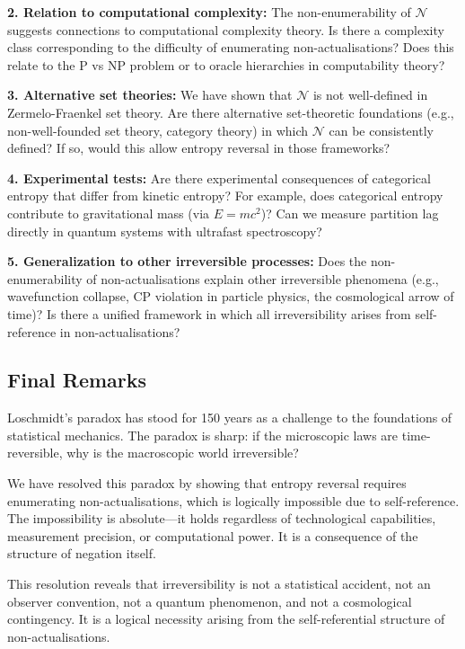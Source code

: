 \documentclass[twocolumn,10pt]{article}
\theoremstyle{definition}
\theoremstyle{remark}
\begin{document}
\textbf{2. Relation to computational complexity:} The non-enumerability of $\mathcal{N}$ suggests connections to computational complexity theory. Is there a complexity class corresponding to the difficulty of enumerating non-actualisations? Does this relate to the P vs NP problem or to oracle hierarchies in computability theory?

\textbf{3. Alternative set theories:} We have shown that $\mathcal{N}$ is not well-defined in Zermelo-Fraenkel set theory. Are there alternative set-theoretic foundations (e.g., non-well-founded set theory, category theory) in which $\mathcal{N}$ can be consistently defined? If so, would this allow entropy reversal in those frameworks?

\textbf{4. Experimental tests:} Are there experimental consequences of categorical entropy that differ from kinetic entropy? For example, does categorical entropy contribute to gravitational mass (via $E = mc^2$)? Can we measure partition lag directly in quantum systems with ultrafast spectroscopy?

\textbf{5. Generalization to other irreversible processes:} Does the non-enumerability of non-actualisations explain other irreversible phenomena (e.g., wavefunction collapse, CP violation in particle physics, the cosmological arrow of time)? Is there a unified framework in which all irreversibility arises from self-reference in non-actualisations?

\subsection{Final Remarks}

Loschmidt's paradox has stood for 150 years as a challenge to the foundations of statistical mechanics. The paradox is sharp: if the microscopic laws are time-reversible, why is the macroscopic world irreversible?

We have resolved this paradox by showing that entropy reversal requires enumerating non-actualisations, which is logically impossible due to self-reference. The impossibility is absolute—it holds regardless of technological capabilities, measurement precision, or computational power. It is a consequence of the structure of negation itself.

This resolution reveals that irreversibility is not a statistical accident, not an observer convention, not a quantum phenomenon, and not a cosmological contingency. It is a logical necessity arising from the self-referential structure of non-actualisations.
\end{document}
